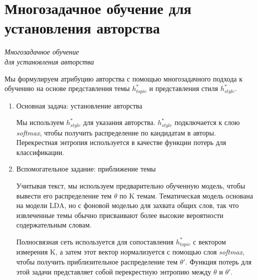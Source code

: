 \documentclass{article}
\begin{document}
\section{Многозадачное обучение для установления авторства}
\begin{center}
\emph{Многозадачное обучение}\\
\emph{для установления авторства}
\end{center}
\par Мы формулируем атрибуцию авторства 
с помощью многозадачного подхода к обучению на основе представления темы 
$h^{*}_{topic}$ и представления стиля $h^{*}_{style}$.
\begin{enumerate}[label={\arabic*)}, left=10pt]
    \item Основная задача: установление авторства
    \par Мы используем $h^{*}_{style}$ для указания авторства. 
    $h^{*}_{style}$ подключается к слою \textit{softmax}, чтобы получить распределение по кандидатам в авторы. 
    Перекрестная энтропия используется в качестве функции потерь для классификации.
    \item Вспомогательное задание: приближение темы
    \par Учитывая текст, мы используем предварительно обученную модель, 
    чтобы вывести его распределение тем $\theta$ по K темам. 
    Тематическая модель основана на модели 
    LDA, но с фоновой моделью для захвата общих слов, так что извлеченные темы обычно присваивают более высокие вероятности 
    содержательным словам.
    \par Полносвязная сеть используется для сопоставления $h^{*}_{topic}$ с вектором измерения K, 
    а затем этот вектор нормализуется с помощью слоя \textit{softmax}, 
    чтобы получить приблизительное распределение тем $\theta'$. Функция 
    потерь для этой задачи представляет собой перекрестную энтропию между $\theta$ и $\theta'$.
\end {enumerate}
\end{document}
